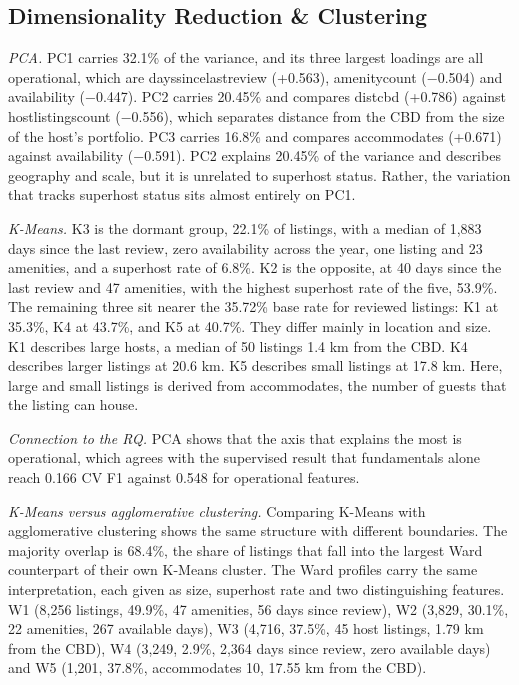 \documentclass[final,1p,11pt]{elsarticle}
\renewcommand\_{\textunderscore\allowbreak}%
\begin{document}
\subsection{Dimensionality Reduction \& Clustering}

\textit{PCA.} PC1 carries 32.1\% of the variance, and its three largest loadings are all operational, which are days\_since\_last\_review (+0.563), amenity\_count (−0.504) and availability\_365 (−0.447). PC2 carries 20.45\% and compares dist\_cbd (+0.786) against host\_listings\_count (−0.556), which separates distance from the CBD from the size of the host's portfolio. PC3 carries 16.8\% and compares accommodates (+0.671) against availability\_365 (−0.591). PC2 explains 20.45\% of the variance and describes geography and scale, but it is unrelated to superhost status. Rather, the variation that tracks superhost status sits almost entirely on PC1.

\textit{K-Means.} K3 is the dormant group, 22.1\% of listings, with a median of 1,883 days since the last review, zero availability across the year, one listing and 23 amenities, and a superhost rate of 6.8\%. K2 is the opposite, at 40 days since the last review and 47 amenities, with the highest superhost rate of the five, 53.9\%. The remaining three sit nearer the 35.72\% base rate for reviewed listings: K1 at 35.3\%, K4 at 43.7\%, and K5 at 40.7\%. They differ mainly in location and size. K1 describes large hosts, a median of 50 listings 1.4 km from the CBD. K4 describes larger listings at 20.6 km. K5 describes small listings at 17.8 km. Here, large and small listings is derived from accommodates, the number of guests that the listing can house.

\textit{Connection to the RQ.} PCA shows that the axis that explains the most is operational, which agrees with the supervised result that fundamentals alone reach 0.166 CV F1 against 0.548 for operational features.

\textit{K-Means versus agglomerative clustering.} Comparing K-Means with agglomerative clustering shows the same structure with different boundaries. The majority overlap is 68.4\%, the share of listings that fall into the largest Ward counterpart of their own K-Means cluster. The Ward profiles carry the same interpretation, each given as size, superhost rate and two distinguishing features. W1 (8,256 listings, 49.9\%, 47 amenities, 56 days since review), W2 (3,829, 30.1\%, 22 amenities, 267 available days), W3 (4,716, 37.5\%, 45 host listings, 1.79 km from the CBD), W4 (3,249, 2.9\%, 2,364 days since review, zero available days) and W5 (1,201, 37.8\%, accommodates 10, 17.55 km from the CBD).
\end{document}
